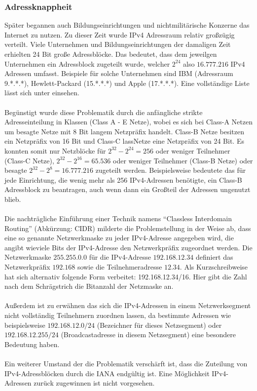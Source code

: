 \documentclass[a4paper,12pt]{scrartcl}
\begin{document}
\subsubsection{Adressknappheit}
Sp\"ater begannen auch Bildungseinrichtungen und nichtmilit\"arische Konzerne das Internet zu nutzen.
Zu dieser Zeit wurde IPv4 Adressraum relativ gro\ss{}z\"ugig verteilt. Viele Unternehmen und Bildungseinrichtungen der damaligen Zeit erhielten 24 Bit gro\ss{}e Adressbl\"ocke. Das bedeutet, dass dem jeweilgen Unternehmen ein Adressblock zugeteilt wurde, welcher $2^{24}$ also $16.777.216$ IPv4 Adressen umfasst. Beispiele f\"ur solche Unternehmen sind IBM (Adressraum 9.*.*.*), Hewlett-Packard (15.*.*.*) und Apple (17.*.*.*). Eine vollst\"andige Liste l\"asst sich unter \cite{ianaipv4list} einsehen.\\
\\
Beg\"unstigt wurde diese Problematik durch die anf\"angliche strikte Adresseinteilung in Klassen (Class A - E Netze), wobei es sich bei Class-A Netzen um besagte Netze mit 8 Bit langem Netzpr\"afix handelt. Class-B Netze besitzen ein Netzpr\"afix von 16 Bit und Class-C lassNetze eine Netzpr\"afix von 24 Bit. Es konnten somit nur Netzbl\"ocke f\"ur $2^{32} - 2^{24} = 256$ oder weniger Teilnehmer (Class-C Netze), $2^{32} - 2^{16} = 65.536$ oder weniger Teilnehmer (Class-B Netze) oder besagte $2^{32} - 2^{8} = 16.777.216$ zugeteilt werden. Beispielsweise bedeutete das f\"ur jede Einrichtung, die wenig mehr als 256 IPv4-Adressen ben\"otigte, ein Class-B Adressblock zu beantragen, auch wenn dann ein Gro\ss{}teil der Adressen ungenutzt blieb.\\
\\
Die nachtr\"agliche Einf\"uhrung einer Technik namens "`Classless Interdomain Routing"' (Abk\"urzung: CIDR) milderte die Problemstellung in der Weise ab, dass eine so genannte Netzwerkmaske zu jeder IPv4-Adresse angegeben wird, die angibt wieviele Bits der IPv4-Adresse den Netzwerkpr\"afix zugeordnet werden. Die Netzwerkmaske $255.255.0.0$ f\"ur die IPv4-Adresse $192.168.12.34$ definiert das Netzwerkpr\"afix $192.168$ sowie die Teilnehmeradresse $12.34$. Als Kurzschreibweise hat sich alternativ folgende Form verbeitet: 192.168.12.34/16. Hier gibt die Zahl nach dem Schr\"agstrich die Bitanzahl der Netzmaske an.\\
\\
Au\ss{}erdem ist zu erw\"ahnen das sich die IPv4-Adressen in einem Netzwerksegment nicht vollst\"andig Teilnehmern zuordnen lassen, da bestimmte Adressen wie beispielsweise $192.168.12.0/24$ (Bezeichner f\"ur dieses Netzsegment) oder $192.168.12.255/24$ (Broadcastadresse in diesem Netzsegment) eine besondere Bedeutung haben. \\
\\
Ein weiterer Umstand der die Problematik versch\"arft ist, dass die Zuteilung von IPv4-Adressbl\"ocken durch die IANA endg\"ultig ist. Eine M\"oglichkeit IPv4-Adressen zur\"uck zugewinnen ist nicht vorgesehen. 
\end{document}
